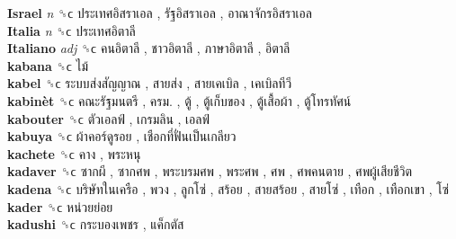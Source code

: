 \textbf{Israel} \emph{n}  ␝ϲ   ประเทศอิสราเอล ,  รัฐอิสราเอล ,  อาณาจักรอิสราเอล   \\
\textbf{Italia} \emph{n}  ␝ϲ   ประเทศอิตาลี   \\
\textbf{Italiano} \emph{adj}  ␝ϲ   คนอิตาลี ,  ชาวอิตาลี ,  ภาษาอิตาลี ,  อิตาลี   \\
\textbf{kabana} ␝ϲ   ไม้   \\
\textbf{kabel} ␝ϲ   ระบบส่งสัญญาณ ,  สายส่ง ,  สายเคเบิล ,  เคเบิลทีวี   \\
\textbf{kabinèt} ␝ϲ   คณะรัฐมนตรี ,  ครม. ,  ตู้ ,  ตู้เก็บของ ,  ตู้เสื้อผ้า ,  ตู้โทรทัศน์   \\
\textbf{kabouter} ␝ϲ   ตัวเอลฟ์ ,  เกรมลิน ,  เอลฟ์   \\
\textbf{kabuya} ␝ϲ   ผ้าคอร์ดูรอย ,  เชือกที่ฟั่นเป็นเกลียว   \\
\textbf{kachete} ␝ϲ   คาง ,  พระหนุ   \\
\textbf{kadaver} ␝ϲ   ซากผี ,  ซากศพ ,  พระบรมศพ ,  พระศพ ,  ศพ ,  ศพคนตาย ,  ศพผู้เสียชีวิต   \\
\textbf{kadena} ␝ϲ   บริษัทในเครือ ,  พวง ,  ลูกโซ่ ,  สร้อย ,  สายสร้อย ,  สายโซ่ ,  เทือก ,  เทือกเขา ,  โซ่   \\
\textbf{kader} ␝ϲ   หน่วยย่อย   \\
\textbf{kadushi} ␝ϲ   กระบองเพชร ,  แค็กตัส   \\
